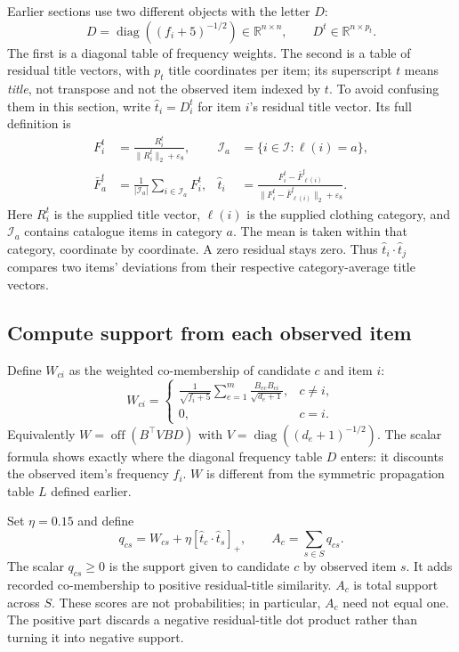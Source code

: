 \documentclass[11pt,a4paper]{article}
\newcommand{\I}{\mathcal I}\newcommand{\pos}[1]{\left[#1\right]_+}
\newcommand{\off}{\operatorname{off}}\newcommand{\diag}{\operatorname{diag}}
\numberwithin{equation}{section}
\begin{document}
Earlier sections use two different objects with the letter $D$:
\[
 D=\diag((f_i+5)^{-1/2})\in\mathbb R^{n\times n},\qquad
 D^t\in\mathbb R^{n\times p_t}.
\]
The first is a diagonal table of frequency weights. The second is a table of
residual title vectors, with $p_t$ title coordinates per item; its superscript
$t$ means \emph{title}, not transpose and not the observed item indexed by $t$.
To avoid confusing them in this section, write $\widehat t_i=D_i^t$ for item
$i$'s residual title vector. Its full definition is
\begin{align}
 F_i^t&=\frac{R_i^t}{\lVert R_i^t\rVert_2+\varepsilon_8},&
 \mathcal I_a&=\{i\in\I:\ell(i)=a\},\\
 \bar F_a^t&=\frac1{|\mathcal I_a|}\sum_{i\in\mathcal I_a}F_i^t,&
 \widehat t_i&=\frac{F_i^t-\bar F_{\ell(i)}^t}
 {\lVert F_i^t-\bar F_{\ell(i)}^t\rVert_2+\varepsilon_8}.
\end{align}
Here $R_i^t$ is the supplied title vector, $\ell(i)$ is the supplied clothing
category, and $\mathcal I_a$ contains catalogue items in category $a$. The mean
is taken within that category, coordinate by coordinate. A zero residual stays
zero. Thus $\widehat t_i\cdot\widehat t_j$ compares two items' deviations from
their respective category-average title vectors.

\subsection{Compute support from each observed item}
Define $W_{ci}$ as the weighted co-membership of candidate $c$ and item $i$:
\begin{equation}
 W_{ci}=\begin{cases}
 \displaystyle\frac1{\sqrt{f_i+5}}\sum_{e=1}^m
             \frac{B_{ec}B_{ei}}{\sqrt{d_e+1}},&c\ne i,\\
 0,&c=i.
 \end{cases}
\end{equation}
Equivalently $W=\off(B^\top VBD)$ with
$V=\diag((d_e+1)^{-1/2})$. The scalar formula shows exactly where the diagonal
frequency table $D$ enters: it discounts the observed item's frequency $f_i$.
$W$ is different from the symmetric propagation table $L$ defined earlier.

Set $\eta=0.15$ and define
\begin{equation}
 q_{cs}=W_{cs}+\eta[\widehat t_c\cdot\widehat t_s]_+,
 \qquad A_c=\sum_{s\in S}q_{cs}.
\end{equation}
The scalar $q_{cs}\ge0$ is the support given to candidate $c$ by observed item
$s$. It adds recorded co-membership to positive residual-title similarity.
$A_c$ is total support across $S$. These scores are not probabilities; in
particular, $A_c$ need not equal one. The positive part discards a negative
residual-title dot product rather than turning it into negative support.
\end{document}
